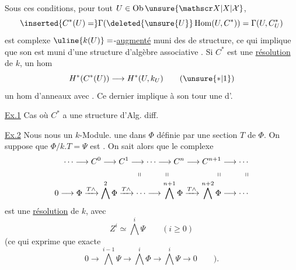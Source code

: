 Sous ces conditions, pour tout \(U\in\operatorname{Ob}\unsure{\mathscr X|X|\mathcal X}\),
\[
 \inserted{C^*(U)=}\Gamma(\deleted{\unsure{U}}\operatorname{Hom}(U,C^*))=
 \Gamma(U,C_U^*)
\]
est complexe \(\uline{k(U)}=\)-\uline{augmenté} muni des  de structure, ce qui implique que son  est muni d'une structure  d'algèbre  associative . Si \(C^*\) est une \uline{résolution} de \(k\),  un hom
\[
 H^*(C^*(U))\longrightarrow H^*(U,k_U)\tag*{(\(\unsure{*|1}\))}
\]
 un hom d'anneaux avec . Ce dernier  implique à son tour une \uline{} d'.

\uline{Ex.1} Cas où \(C^*\) a une structure d'Alg. diff.

\uline{Ex.2} Nous nous  un \(k\)-Module.  une  dans \(\Phi\) définie par une section \(T\) de \(\Phi\). On suppose que \(\Phi/k.T=\Psi\) est . On sait alors que le complexe
\[
 \begin{aligned}
 \cdots\longrightarrow C^0\longrightarrow C^1\longrightarrow\cdots
   \longrightarrow C^n\longrightarrow C^{n+1}\longrightarrow\cdots\\
 \shortparallel\qquad\quad\shortparallel\qquad\qquad\qquad
   \shortparallel\qquad\quad\shortparallel\\[-2pt]
 0\longrightarrow\Phi\xrightarrow{T\wedge}\bigwedge^2\Phi
 \xrightarrow{T\wedge}\cdots\longrightarrow\bigwedge^{n+1}\Phi
 \xrightarrow{T\wedge}\bigwedge^{n+2}\Phi\longrightarrow\cdots
 \end{aligned}
\]
est une \uline{résolution} de \(k\), avec
\[
 Z^i\simeq\bigwedge^i\Psi\qquad(i\geq0)
\]
(ce qui exprime que   exacte 
\[
 0\longrightarrow\bigwedge^{i-1}\Psi\longrightarrow
 \bigwedge^i\Phi\longrightarrow\bigwedge^i\Psi\longrightarrow0\qquad).
\]
